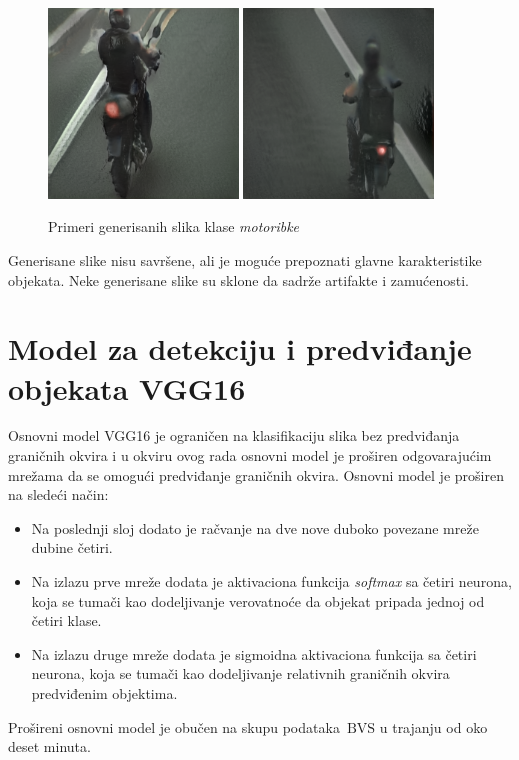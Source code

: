 \documentclass[12pt,oneside]{memoir}
\newcommand{\bvs}{\ensuremath{\,\textrm{BVS}}}
\begin{document}
\begin{figure}[!htbp]
\centering
    \includegraphics[width=0.45\textwidth]{matfmaster/stylegan/motorbike/image2.png}
    \includegraphics[width=0.45\textwidth]{matfmaster/stylegan/motorbike/image9.png}
\caption{Primeri generisanih slika klase \textit{motoribke}}
\label{fig:section4_stylegan_motorbike_images}
\end{figure}

Generisane slike nisu savršene, ali je moguće prepoznati glavne karakteristike objekata. Neke generisane slike su sklone da sadrže artifakte i zamućenosti.


\clearpage
\section{Model za detekciju i predviđanje objekata VGG16}

Osnovni model VGG16 je ograničen na klasifikaciju slika bez predviđanja graničnih okvira i u okviru ovog rada osnovni model je proširen odgovarajućim mrežama da se omogući predviđanje graničnih okvira. Osnovni model je proširen na sledeći način:
\begin{itemize}
\item Na poslednji sloj dodato je račvanje na dve nove duboko povezane mreže dubine četiri.
\item Na izlazu prve mreže dodata je aktivaciona funkcija \textit{softmax}  \cite{ml2019} sa četiri neurona, koja se tumači kao dodeljivanje verovatnoće da objekat pripada jednoj od četiri klase.
\item Na izlazu druge mreže dodata je sigmoidna aktivaciona funkcija sa četiri neurona, koja se tumači kao dodeljivanje relativnih graničnih okvira predviđenim objektima.
\end{itemize}
Prošireni osnovni model je obučen na skupu podataka \bvs{} u trajanju od oko deset minuta.
\end{document}

